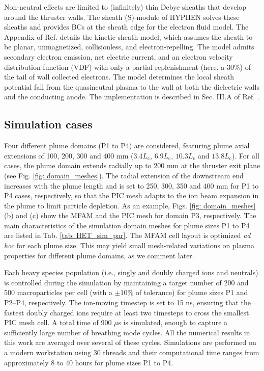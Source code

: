 \documentclass[%
 aip,
cha,
 amsmath,amssymb,
 reprint,%
]{revtex4-1}
\begin{document}
Non-neutral effects are limited to (infinitely) thin Debye sheaths that develop around the thruster walls. The sheath (S)-module of HYPHEN solves these sheaths and provides BCs at the sheath edge for the electron fluid model. The Appendix of Ref.  details the kinetic sheath model, which assumes the sheath to be planar, unmagnetized, collisionless, and electron-repelling. The model admits secondary electron emission,
net electric current, and an
electron velocity distribution function (VDF) with only a partial replenishment (here, a 30\%) of the tail of wall collected electrons. The model determines the local sheath potential fall from the quasineutral plasma to the wall at both the dielectric walls and the conducting anode. 
The implementation is described in Sec. III.A of Ref. .



\subsection{Simulation cases}\label{sec: sim_settings}

Four different plume domains (P1 to P4) are considered, featuring plume axial extensions of 100, 200, 300 and 400 mm ($3.4L_\mathrm{c}$, $6.9L_\mathrm{c}$, $10.3L_\mathrm{c}$ and $13.8L_\mathrm{c}$). For all cases, the plume domain extends radially up to 200 mm at the thruster exit plane (see Fig. \ref{fig: domain_meshes}). The radial extension of the downstream end increases with the plume length and is set to 250, 300, 350 and 400 mm for P1 to P4 cases, respectively, so that the PIC mesh adapts to the ion beam expansion in the plume to limit particle depletion. As an example, Figs. \ref{fig: domain_meshes}(b) and (c) show the MFAM and the PIC mesh for domain P3, respectively. The main characteristics of the simulation domain meshes for plume sizes P1 to P4 are listed in Tab. \ref{tab: HET_sim_par}. 
The MFAM cell layout is optimized \textit{ad hoc} for each plume size. This may yield small mesh-related variations on plasma properties for different plume domains, as we comment later.


Each heavy species population (i.e., singly and doubly charged ions and neutrals) is controlled during the simulation by maintaining a target number of 200 and 500 macroparticles per cell (with a $\pm 10\%$ of tolerance) for plume sizes P1 and P2–P4, respectively.
%
The ion-moving timestep is set to 15 ns, ensuring that the fastest doubly charged ions require at least two timesteps to cross the smallest PIC mesh cell.
A total time of 900 $\mu$s is simulated, enough to capture a sufficiently large number of breathing mode cycles. All the numerical results in this work are averaged over several of these cycles.
%
Simulations are performed on a modern workstation using 30 threads 
and their computational time ranges from approximately 8 to 40 hours for plume sizes P1 to P4.
\end{document}
